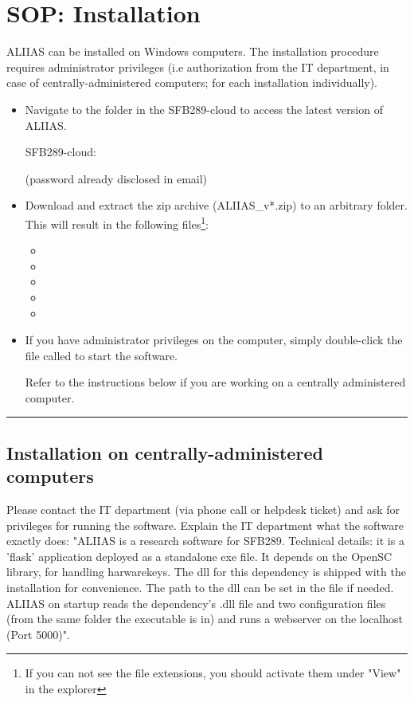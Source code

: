 \section{SOP: Installation}
\label{section:sop_installation}
ALIIAS can be installed on Windows computers. The installation procedure requires administrator privileges (i.e authorization from the IT department, in case of centrally-administered computers; for each installation individually).

\begin{itemize}
    \item Navigate to the  folder in the SFB289-cloud to access the latest version of ALIIAS.
    
    SFB289-cloud: \href{https://uni-duisburg-essen.sciebo.de/s/yYzEg59bvl8focL}{\color{pniblue}{https://uni-duisburg-essen.sciebo.de/s/yYzEg59bvl8focL}}
    
    (password already disclosed in email)
    
    \item Download and extract the zip archive (ALIIAS\_v*.zip) to an arbitrary folder. This will result in the following files\footnote{If you can not see the file extensions, you should activate them under "View" in the explorer}: 
    \begin{itemize}
        \item {}
        \item {}
        \item {}
        \item {} 
        \item {}
    \end{itemize}
    \item If you have administrator privileges on the computer, simply double-click the file called  to start the software.
    
    Refer to the instructions below if you are working on a centrally administered computer.
\end{itemize} 
\par\noindent\rule{\textwidth\color{pniblue}}{0.4pt}

\subsection*{Installation on centrally-administered computers}

Please contact the IT department (via phone call or helpdesk ticket) and ask for privileges for running the software. Explain the IT department what the software exactly does: "ALIIAS is a research software for SFB289. Technical details: it is a 'flask' application deployed as a standalone exe file. It depends on the OpenSC library, for handling harwarekeys. The dll for this dependency is shipped with the installation for convenience. The path to the dll can be set in the file  if needed. ALIIAS on startup reads the dependency's .dll file and two configuration files (from the same folder the executable is in) and runs a webserver on the localhost (Port 5000)".

